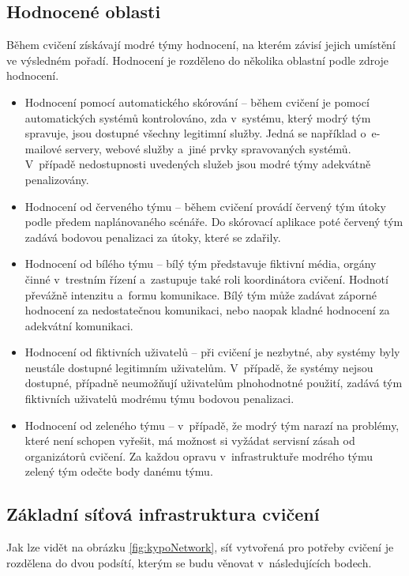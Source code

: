 \documentclass[
  digital,
  twoside,
  table, 
  nolof, 
  nolot
]{fithesis3}
\begin{document}
\subsection{Hodnocené oblasti}
Během cvičení získávají modré týmy hodnocení, na kterém závisí jejich umístění ve výsledném pořadí. Hodnocení je rozděleno do několika oblastní podle zdroje hodnocení.

\begin{itemize}
\item Hodnocení pomocí automatického skórování -- během cvičení je pomocí automatických systémů kontrolováno, zda v~systému, který modrý tým spravuje, jsou dostupné všechny legitimní služby. Jedná se například o~e-mailové servery, webové služby a~jiné prvky spravovaných systémů. V~případě nedostupnosti uvedených služeb jsou modré týmy adekvátně penalizovány.
\item Hodnocení od červeného týmu -- během cvičení provádí červený tým útoky podle předem naplánovaného scénáře. Do skórovací aplikace poté červený tým zadává bodovou penalizaci za útoky, které se zdařily.
\item Hodnocení od bílého týmu -- bílý tým představuje fiktivní média, orgány činné v~trestním řízení a~zastupuje také roli koordinátora cvičení. Hodnotí převážně intenzitu a~formu komunikace. Bílý tým může zadávat záporné hodnocení za nedostatečnou komunikaci, nebo naopak kladné hodnocení za adekvátní komunikaci.
\item Hodnocení od fiktivních uživatelů -- při cvičení je nezbytné, aby systémy byly neustále dostupné legitimním uživatelům. V~případě, že systémy nejsou dostupné, případně neumožňují uživatelům plnohodnotné použití, zadává tým fiktivních uživatelů modrému týmu bodovou penalizaci.
\item Hodnocení od zeleného týmu -- v~případě, že modrý tým narazí na problémy, které není schopen vyřešit, má možnost si vyžádat servisní zásah od organizátorů cvičení. Za každou opravu v~infrastruktuře modrého týmu zelený tým odečte body danému týmu.
\end{itemize}

\subsection{Základní síťová infrastruktura cvičení}
Jak lze vidět na obrázku \ref{fig:kypoNetwork}, síť vytvořená pro potřeby cvičení je rozdělena do dvou podsítí, kterým se budu věnovat v~následujících bodech.
\end{document}
